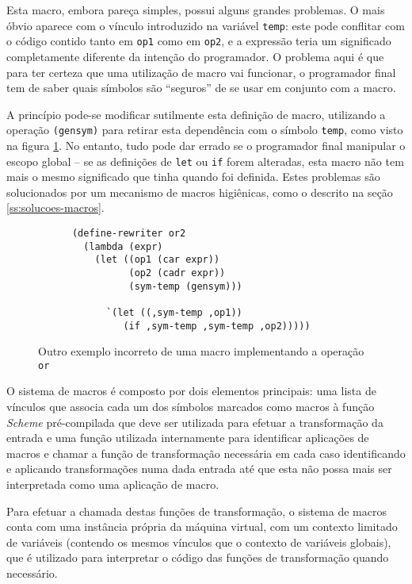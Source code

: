 Esta macro, embora pareça simples, possui alguns grandes problemas. O mais
óbvio aparece com o vínculo introduzido na variável \texttt{temp}: este pode
conflitar com o código contido tanto em \texttt{op1} como em \texttt{op2}, e a
expressão teria um significado completamente diferente da intenção do
programador. O problema aqui é que para ter certeza que uma utilização de macro
vai funcionar, o programador final tem de saber quais símbolos são ``seguros''
de se usar em conjunto com a macro.

A princípio pode-se modificar sutilmente esta definição de macro, utilizando a
operação \texttt{(gensym)} para retirar esta dependência com o símbolo
\texttt{temp}, como visto na figura \ref{fig:exemplo-defmacro2}. No entanto,
tudo pode dar errado se o programador final manipular o escopo global -- se as
definições de \texttt{let} ou \texttt{if} forem alteradas, esta macro não tem
mais o mesmo significado que tinha quando foi definida. Estes problemas são
solucionados por um mecanismo de macros higiênicas, como o descrito na seção
\ref{ss:solucoes-macros}.

\begin{figure}[h!]

\begin{lstlisting}
      (define-rewriter or2
        (lambda (expr)
          (let ((op1 (car expr))
                (op2 (cadr expr))
                (sym-temp (gensym)))
          
			`(let ((,sym-temp ,op1))
               (if ,sym-temp ,sym-temp ,op2)))))
\end{lstlisting}
\caption{Outro exemplo incorreto de uma macro implementando a operação
         \texttt{or}} 
\label{fig:exemplo-defmacro2} \end{figure}

O sistema de macros é composto por dois elementos principais: uma lista de 
vínculos que associa cada um dos símbolos marcados como macros à função
\textit{Scheme} pré-compilada que deve ser utilizada para efetuar a
transformação da entrada e uma função utilizada internamente para identificar
aplicações de macros e chamar a função de transformação necessária em cada caso
identificando e aplicando transformações numa dada entrada até que esta não 
possa mais ser interpretada como uma aplicação de macro.

Para efetuar a chamada destas funções de transformação, o sistema de macros
conta com uma instância própria da máquina virtual, com um contexto limitado de
variáveis (contendo os mesmos vínculos que o contexto de variáveis globais),
que é utilizado para interpretar o código das funções de transformação quando
necessário.

